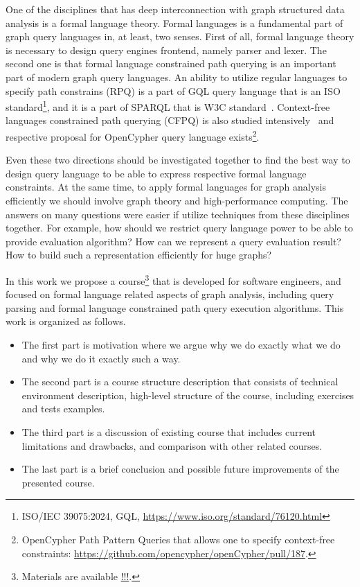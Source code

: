 \documentclass[sigconf]{acmart}
\begin{document}
One of the disciplines that has deep interconnection with graph structured data analysis is a formal language theory.
Formal languages is a fundamental part of graph query languages in, at least, two senses.
First of all, formal language theory is necessary to design query engines frontend, namely parser and lexer.
The second one is that formal language constrained path querying is an important part of modern graph query languages. 
An ability to utilize regular languages to specify path constrains (RPQ) is a part of GQL query language that is an ISO standard\footnote{ISO/IEC 39075:2024, GQL, \url{https://www.iso.org/standard/76120.html}}, and it is a part of SPARQL that is W3C standard~\cite{2013sparql}.
Context-free languages constrained path querying (CFPQ) is also studied intensively~\cite{10.1145/3335783.3335791,10.1145/3167132.3167265,HELLINGS2025102475,10.1145/3398682.3399163} and respective proposal for OpenCypher query language exists\footnote{OpenCypher Path Pattern Queries that allows one to specify context-free constraints: \url{https://github.com/opencypher/openCypher/pull/187}.}.

Even these two directions should be investigated together to find the best way to design query language to be able to express respective formal language constraints.
At the same time, to apply formal languages for graph analysis efficiently we should involve graph theory and high-performance computing.
The answers on many questions were easier if utilize techniques from these disciplines together.
For example, how should we restrict query language power to be able to provide evaluation algorithm?
How can we represent a query evaluation result?
How to build such a representation efficiently for huge graphs?

In this work we propose a course\footnote{Materials are available \url{!!!}.} that is developed for software engineers, and focused on formal language related aspects of graph analysis, including query parsing and formal language constrained path query execution algorithms.
This work is organized as follows.
\begin{itemize}
  \item The first part is motivation where we argue why we do exactly what we do and why we do it exactly such a way. 
  \item The second part is a course structure description that consists of technical environment description, high-level structure of the course, including exercises and tests examples.
  \item The third part is a discussion of existing course that includes current limitations and drawbacks, and comparison with other related courses.
  \item The last part is a brief conclusion and possible future improvements of the presented course.
\end{itemize}  
\end{document}
